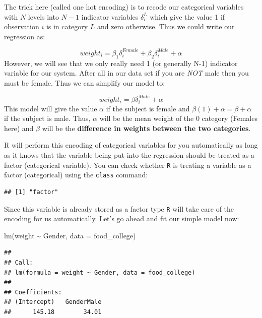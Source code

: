 \documentclass[
]{book}
\newenvironment{Shaded}{\begin{snugshade}}{\end{snugshade}}
\newcommand{\AttributeTok}[1]{\textcolor[rgb]{0.77,0.63,0.00}{#1}}
\newcommand{\FunctionTok}[1]{\textcolor[rgb]{0.00,0.00,0.00}{#1}}
\newcommand{\NormalTok}[1]{#1}
\newcommand{\SpecialCharTok}[1]{\textcolor[rgb]{0.00,0.00,0.00}{#1}}
\theoremstyle{definition}
\theoremstyle{definition}
\theoremstyle{definition}
\theoremstyle{definition}
\theoremstyle{remark}
\begin{document}
The trick here (called one hot encoding) is to recode our categorical variables with \(N\) levels into \(N-1\) indicator variables \(\delta_i^L\) which give the value 1 if observation \(i\) is in category \(L\) and zero otherwise. Thus we could write our regression as:

\[weight_i=\beta_1 \delta_i^{Female}+ \beta_2 \delta_i^{Male}+\alpha\]
However, we will see that we only really need 1 (or generally N-1) indicator variable for our system. After all in our data set if you are \emph{NOT} male then you must be female. Thus we can simplify our model to:

\[weight_i=\beta \delta_i^{Male}+\alpha\]
This model will give the value \(\alpha\) if the subject is female and \(\beta(1)+\alpha=\beta+\alpha\) if the subject is male. Thus, \(\alpha\) will be the mean weight of the \(0\) category (Females here) and \(\beta\) will be the \textbf{difference in weights between the two categories}.

R will perform this encoding of categorical variables for you automatically as long as it knows that the variable being put into the regression should be treated as a factor (categorical variable). You can check whether \texttt{R} is treating a variable as a factor (categorical) using the \texttt{class} command:

\begin{Shaded}
\end{Shaded}

\begin{verbatim}
## [1] "factor"
\end{verbatim}

Since this variable is already stored as a factor type \texttt{R} will take care of the encoding for us automatically. Let's go ahead and fit our simple model now:

\begin{Shaded}
\begin{Highlighting}[]
\FunctionTok{lm}\NormalTok{(weight }\SpecialCharTok{\textasciitilde{}}\NormalTok{ Gender, }\AttributeTok{data =}\NormalTok{ food\_college)}
\end{Highlighting}
\end{Shaded}

\begin{verbatim}
## 
## Call:
## lm(formula = weight ~ Gender, data = food_college)
## 
## Coefficients:
## (Intercept)   GenderMale  
##      145.18        34.01
\end{verbatim}
\end{document}
